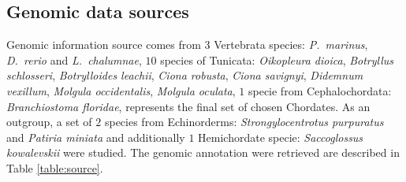 \documentclass[11pt]{article}
\begin{document}
\subsection*{Genomic data sources}

Genomic information source comes from $3$ Vertebrata species:
\textit{P.\ marinus}, \textit{D.\ rerio} and \textit{L.\ chalumnae}, $10$
species of Tunicata: \textit{Oikopleura dioica}, \textit{Botryllus schlosseri}, 
\textit{Botrylloides leachii}, \textit{Ciona robusta}, \textit{Ciona savignyi}, 
\textit{Didemnum vexillum}, \textit{Molgula occidentalis}, \textit{Molgula 
oculata}, $1$ specie from Cephalochordata: \textit{Branchiostoma floridae}, 
represents the final set of chosen Chordates. As an outgroup, a set of 
$2$ species from Echinorderms: \textit{Strongylocentrotus purpuratus} and 
\textit{Patiria miniata} and additionally $1$ Hemichordate 
specie: \textit{Saccoglossus kowalevskii} were studied. The genomic 
annotation were retrieved are described in Table \ref{table:source}. 
\end{document}
